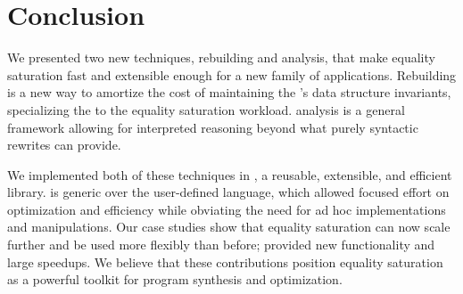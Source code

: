 \section{Conclusion}
\label{sec:conclusion}

We presented two new techniques,
  rebuilding and \eclass analysis,
  that make equality saturation
  fast and extensible enough for a new family of
  applications.
Rebuilding is a new way to
  amortize the cost of maintaining the \egraph's
  data structure invariants,
  specializing the \egraph to the equality saturation workload.
\Eclass analysis is a general framework
  allowing for interpreted reasoning
  beyond what purely syntactic rewrites can provide.

We implemented both of these techniques in \egg,
  a reusable, extensible, and efficient \egraph library.
\Egg is generic over the user-defined language,
  which allowed focused effort on optimization and efficiency
  while obviating the need for
  ad hoc \egraph implementations and manipulations.
Our case studies show that equality saturation can now scale
  further and be used more flexibly than before;
  \egg provided new functionality and large speedups.
We believe that these contributions
  position equality saturation as a powerful toolkit for
  program synthesis and optimization.





